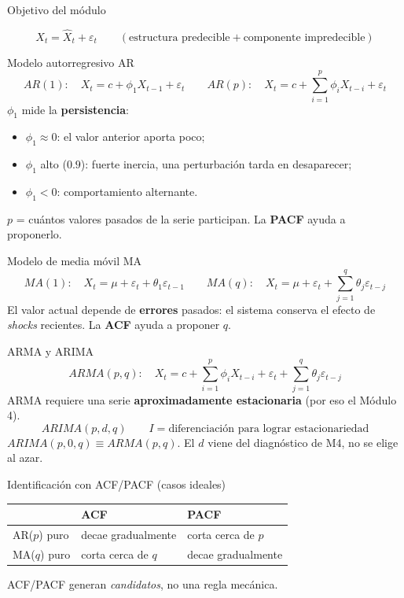 



\begin{frame}{Objetivo del módulo}

\[
X_t=\hat X_t+\varepsilon_t\qquad(\text{estructura predecible}+\text{componente impredecible})
\]
\end{frame}

\begin{frame}{Modelo autorregresivo AR}
\[
AR(1):\quad X_t=c+\phi_1 X_{t-1}+\varepsilon_t
\qquad
AR(p):\quad X_t=c+\sum_{i=1}^{p}\phi_i X_{t-i}+\varepsilon_t
\]
$\phi_1$ mide la \textbf{persistencia}:
\begin{itemize}
  \item $\phi_1\approx0$: el valor anterior aporta poco;
  \item $\phi_1$ alto ($0.9$): fuerte inercia, una perturbación tarda en desaparecer;
  \item $\phi_1<0$: comportamiento alternante.
\end{itemize}
$p$ = cuántos valores pasados de la serie participan. La \textbf{PACF} ayuda a proponerlo.
\end{frame}

\begin{frame}{Modelo de media móvil MA}
\[
MA(1):\quad X_t=\mu+\varepsilon_t+\theta_1\varepsilon_{t-1}
\qquad
MA(q):\quad X_t=\mu+\varepsilon_t+\sum_{j=1}^{q}\theta_j\varepsilon_{t-j}
\]
 El valor actual depende de
\textbf{errores} pasados: el sistema conserva el efecto de \emph{shocks} recientes.
La \textbf{ACF} ayuda a proponer $q$.
\end{frame}

\begin{frame}{ARMA y ARIMA}
\[
ARMA(p,q):\quad X_t=c+\sum_{i=1}^{p}\phi_i X_{t-i}+\varepsilon_t+\sum_{j=1}^{q}\theta_j\varepsilon_{t-j}
\]
ARMA requiere una serie \textbf{aproximadamente estacionaria} (por eso el Módulo 4).
\[
\boxed{ARIMA(p,d,q)}\qquad I = \text{diferenciación para lograr estacionariedad}
\]
$ARIMA(p,0,q)\equiv ARMA(p,q)$. El $d$ viene del diagnóstico de M4, no se elige al azar.
\end{frame}

\begin{frame}{Identificación con ACF/PACF (casos ideales)}
\begin{center}
\begin{tabular}{lll}
\toprule
& ACF & PACF\\
\midrule
AR($p$) puro & decae gradualmente & corta cerca de $p$\\
MA($q$) puro & corta cerca de $q$ & decae gradualmente\\
\bottomrule
\end{tabular}
\end{center}
\vfill
{} ACF/PACF generan
\emph{candidatos}, no una regla mecánica.
\end{frame}


